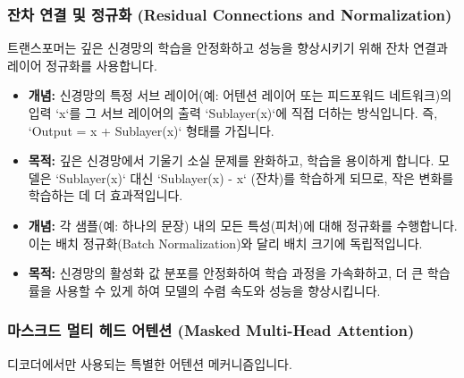 \documentclass[11pt,a4paper]{article}
\begin{document}
\subsubsection{잔차 연결 및 정규화 (Residual Connections and Normalization)}
트랜스포머는 깊은 신경망의 학습을 안정화하고 성능을 향상시키기 위해 잔차 연결과 레이어 정규화를 사용합니다.

\begin{conceptbox}[title={잔차 연결 (Residual Connections, Shortcut Connections)}]
\begin{itemize}
    \item \textbf{개념:} 신경망의 특정 서브 레이어(예: 어텐션 레이어 또는 피드포워드 네트워크)의 입력 `x`를 그 서브 레이어의 출력 `Sublayer(x)`에 직접 더하는 방식입니다. 즉, `Output = x + Sublayer(x)` 형태를 가집니다.
    \item \textbf{목적:} 깊은 신경망에서 기울기 소실 문제를 완화하고, 학습을 용이하게 합니다. 모델은 `Sublayer(x)` 대신 `Sublayer(x) - x` (잔차)를 학습하게 되므로, 작은 변화를 학습하는 데 더 효과적입니다.
\end{itemize}
\end{conceptbox}

\begin{conceptbox}[title={레이어 정규화 (Layer Normalization)}]
\begin{itemize}
    \item \textbf{개념:} 각 샘플(예: 하나의 문장) 내의 모든 특성(피처)에 대해 정규화를 수행합니다. 이는 배치 정규화(Batch Normalization)와 달리 배치 크기에 독립적입니다.
    \item \textbf{목적:} 신경망의 활성화 값 분포를 안정화하여 학습 과정을 가속화하고, 더 큰 학습률을 사용할 수 있게 하여 모델의 수렴 속도와 성능을 향상시킵니다.
\end{itemize}
\end{conceptbox}

\subsubsection{마스크드 멀티 헤드 어텐션 (Masked Multi-Head Attention)}
디코더에서만 사용되는 특별한 어텐션 메커니즘입니다.
\end{document}

